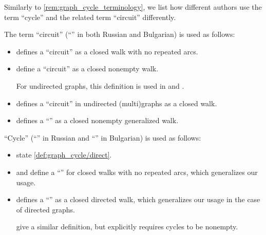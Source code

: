 \begin{remark}\label{rem:graph_cycle_terminology}
  Similarly to \cref{rem:graph_cycle_terminology}, we list how different authors use the term \enquote{cycle} and the related term \enquote{circuit} differently.

  \begin{thmenum}
     The term \enquote{circuit} (\enquote{} in both Russian and Bulgarian) is used as follows:
    \begin{itemize}
      \item \Textcite[5]{Bollobás1998ModernGraphTheory} defines a \enquote{circuit} as a closed walk with no repeated arcs.

      \item \Textcite[13]{GondranMinoux1984GraphsAndAlgorithms} define a \enquote{circuit} as a closed nonempty walk.

      For undirected graphs, this definition is used in \cite[def. 1.1.3]{Knauer2019AlgebraicGraphTheory} and \cite[279]{БелоусовТкачёв2004ДискретнаяМатематика}.

      \item \Textcite[def. 10.4.1]{Rosen2019DiscreteMathematics} defines a \enquote{circuit} in undirected (multi)graphs as a closed walk.

      \item \Textcite[11]{Мирчев2001Графи} defines a \enquote{} as a closed nonempty generalized walk.
    \end{itemize}

     \enquote{Cycle} (\enquote{} in Russian and \enquote{} in Bulgarian) is used as follows:
    \begin{itemize}
      \item \Textcite[279]{БелоусовТкачёв2004ДискретнаяМатематика} state \cref{def:graph_cycle/direct}.

      \item \Textcite[22]{ЕмеличевИПр1990ТеорияГрафов} and \textcite[\S 7.2.3]{Новиков2013ДискретнаяМатематика} define a \enquote{} for closed walks with no repeated arcs, which generalizes our usage.

      \item \Textcite[11]{Мирчев2001Графи} defines a \enquote{} as a closed directed walk, which generalizes our usage in the case of directed graphs.

      \Textcite[def. 1.1.3]{Knauer2019AlgebraicGraphTheory} give a similar definition, but explicitly requires cycles to be nonempty.


\end{itemize}
\end{thmenum}
\end{remark}
